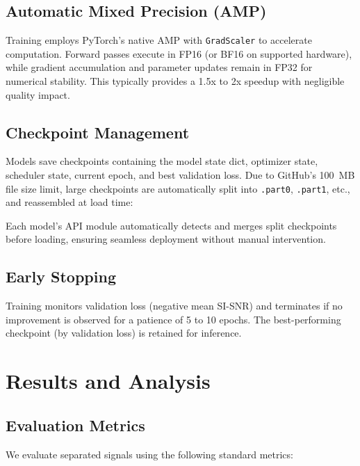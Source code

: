 \documentclass[conference]{IEEEtran}
\begin{document}
\subsection{Automatic Mixed Precision (AMP)}

Training employs PyTorch's native AMP with \texttt{GradScaler} to accelerate computation. Forward passes execute in FP16 (or BF16 on supported hardware), while gradient accumulation and parameter updates remain in FP32 for numerical stability. This typically provides a 1.5x to 2x speedup with negligible quality impact.

\subsection{Checkpoint Management}

Models save checkpoints containing the model state dict, optimizer state, scheduler state, current epoch, and best validation loss. Due to GitHub's 100~MB file size limit, large checkpoints are automatically split into \texttt{.part0}, \texttt{.part1}, etc., and reassembled at load time:

Each model's API module automatically detects and merges split checkpoints before loading, ensuring seamless deployment without manual intervention.

\subsection{Early Stopping}

Training monitors validation loss (negative mean SI-SNR) and terminates if no improvement is observed for a patience of 5 to 10 epochs. The best-performing checkpoint (by validation loss) is retained for inference.

\section{Results and Analysis}
\label{sec:results}

\subsection{Evaluation Metrics}

We evaluate separated signals using the following standard metrics:
\end{document}
